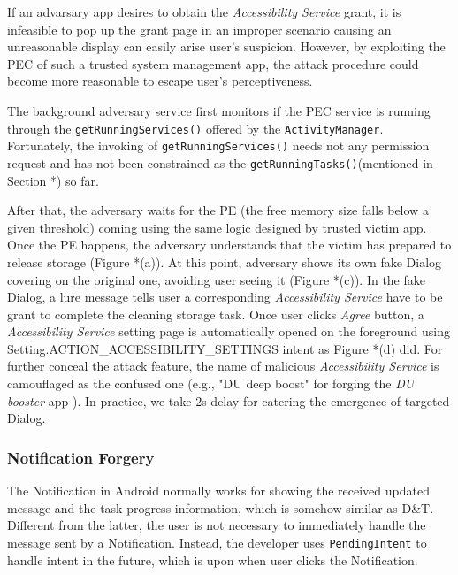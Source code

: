 If an advarsary app desires to obtain the \textit{Accessibility Service} grant, it is infeasible to pop up the grant page in an improper scenario causing an unreasonable display can easily arise user's suspicion. However, by exploiting the PEC of such a trusted system management app, the attack procedure could become more reasonable to escape user's perceptiveness. 

The background adversary service first monitors if the PEC service is running through the \texttt{getRunningServices()} offered by the \texttt{ActivityManager}. Fortunately, the invoking of \texttt{getRunningServices()} needs not any permission request and has not been constrained as the \texttt{getRunningTasks()}(mentioned in Section *) so far. 

After that, the adversary waits for the PE (the free memory size falls below a given threshold) coming using the same logic designed by trusted victim app. Once the PE happens, the adversary understands that the victim has prepared to release storage (Figure *(a)). At this point, adversary shows its own fake Dialog covering on the original one, avoiding user seeing it (Figure *(c)). In the fake Dialog, a lure message tells user a corresponding \textit{Accessibility Service} have to be grant to complete the cleaning storage task. Once user clicks \textit{Agree} button, a \textit{Accessibility Service} setting page is automatically opened on the foreground using Setting.ACTION\_ACCESSIBILITY\_SETTINGS intent as Figure *(d) did. For further conceal the attack feature, the name of malicious \textit{Accessibility Service} is camouflaged as the confused one (e.g., "DU deep boost" for forging the \textit{DU booster} app ). In practice, we take 2s delay for catering the emergence of targeted Dialog. 

\subsubsection{Notification Forgery}
The Notification in Android normally works for showing the received updated message and the task progress information, which is somehow similar as D\&T. Different from the latter, the user is not necessary to immediately handle the message sent by a Notification. Instead, the developer uses \texttt{PendingIntent} to handle intent in the future, which is upon when user clicks the Notification. 

